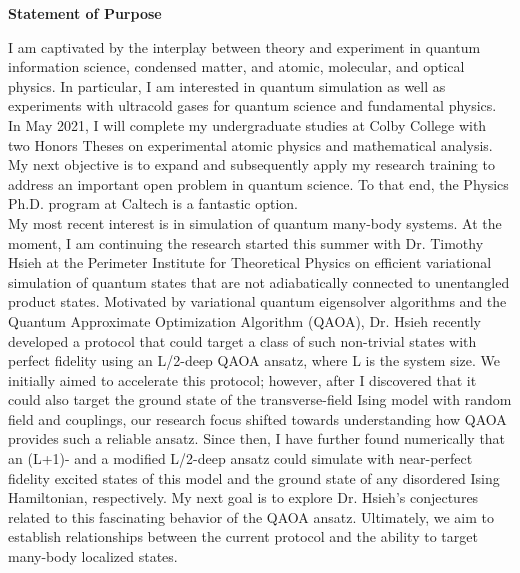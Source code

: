 \documentclass[12pt]{article}
\begin{document}
\begin{center}
	\textbf{Statement of Purpose}
\end{center}
I am captivated by the interplay between theory and experiment in quantum information science, condensed matter, and atomic, molecular, and optical physics. In particular, I am interested in  quantum simulation as well as experiments with ultracold gases for quantum science and fundamental physics. In May 2021, I will complete my undergraduate studies at Colby College with two Honors Theses on experimental atomic physics and mathematical analysis. My next objective is to expand and subsequently apply my research training to address an important open problem in quantum science. To that end, the Physics Ph.D. program at Caltech is a fantastic option.  \\ 

My most recent interest is in simulation of quantum many-body systems. At the moment, I am continuing the research started this summer with Dr. Timothy Hsieh at the Perimeter Institute for Theoretical Physics on efficient variational simulation of quantum states that are not adiabatically connected to unentangled product states. Motivated by variational quantum eigensolver algorithms and the Quantum Approximate Optimization Algorithm (QAOA), Dr. Hsieh recently developed a protocol that could target a class of such non-trivial  states with perfect fidelity using an L/2-deep QAOA ansatz, where L is the system size. We initially aimed to accelerate this protocol; however, after I discovered that it could also target the ground state of the transverse-field Ising model with random field and couplings, our research focus shifted towards understanding how QAOA provides such a reliable ansatz. Since then, I have further found numerically that an (L+1)- and a modified L/2-deep ansatz could simulate with near-perfect fidelity excited states of this model and the ground state of any disordered Ising Hamiltonian, respectively. My next goal is to explore Dr. Hsieh's conjectures related to this fascinating behavior of the QAOA ansatz. Ultimately, we aim to establish relationships between the current protocol and the ability to target many-body localized states.\\
\end{document}
